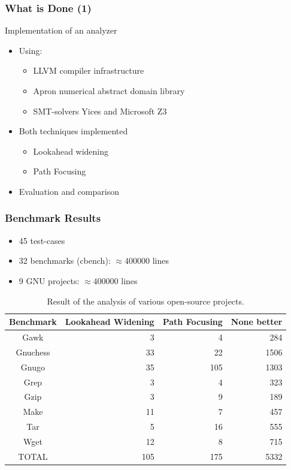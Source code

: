 \documentclass{beamer}
\begin{document}
\begin{frame}
  \frametitle{What is Done (1)}

Implementation of an analyzer
\begin{itemize}
\item 
Using:
\begin{itemize}
\item LLVM compiler infrastructure
\item Apron numerical abstract domain library
\item SMT-solvers Yices and Microsoft Z3
\end{itemize}

\item  Both techniques implemented
\begin{itemize}
\item Lookahead widening
\item Path Focusing
\end{itemize}

\item Evaluation and comparison
\end{itemize}
\end{frame}



\begin{frame}
\frametitle{Benchmark Results}

\begin{itemize}
\item 45 test-cases
\item 32 benchmarks (cbench): $\approx 400000$ lines
\item 9 GNU projects: $\approx 400000$ lines

\end{itemize}

\begin{table}
\centering \small
\begin{tabular}{|c||r|r|r|} \hline 
Benchmark  & Lookahead Widening & Path Focusing & None better \\
\hline \hline
Gawk		& 3		& 4		& 284  \\ \hline
Gnuchess	& 33	& 22	& 1506  \\ \hline
Gnugo		& 35	& 105	& 1303  \\ \hline
Grep		& 3		& 4		& 323  \\ \hline
Gzip		& 3		& 9		& 189  \\ \hline
Make		& 11	&  7	& 457  \\ \hline
Tar			& 5		& 16	& 555  \\ \hline
Wget		& 12	& 8		& 715  \\ \hline \hline
TOTAL		& 105	& 175	& 5332	\\ \hline
\end{tabular}
\caption{Result of the analysis of various open-source projects.}
\label{opensource}
\end{table}
\end{frame}
\end{document}
